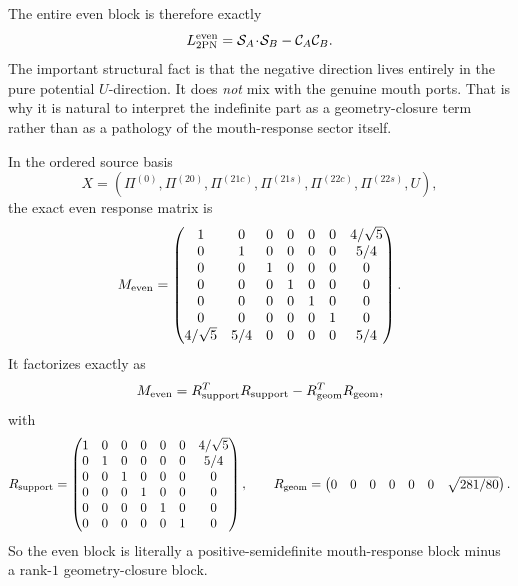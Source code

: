\documentclass[11pt]{article}
\begin{document}
The entire even block is therefore exactly
\begin{equation}
L^{\rm even}_{2\mathrm{PN}}=\mathcal S_A\!\cdot\!\mathcal S_B-\mathcal C_A\mathcal C_B.
\label{eq:mouth-port-even-factorized}
\end{equation}
The important structural fact is that the negative direction lives entirely in the pure
potential \(U\)-direction.  It does \emph{not} mix with the genuine mouth ports.
That is why it is natural to interpret the indefinite part as a geometry-closure term
rather than as a pathology of the mouth-response sector itself.

In the ordered source basis
\begin{equation}
X=(\Pi^{(0)},\Pi^{(20)},\Pi^{(21c)},\Pi^{(21s)},\Pi^{(22c)},\Pi^{(22s)},U),
\label{eq:mouth-port-Xbasis}
\end{equation}
the exact even response matrix is
\begin{equation}
M_{\rm even}=
\begin{pmatrix}
1&0&0&0&0&0&4/\sqrt5\\
0&1&0&0&0&0&5/4\\
0&0&1&0&0&0&0\\
0&0&0&1&0&0&0\\
0&0&0&0&1&0&0\\
0&0&0&0&0&1&0\\
4/\sqrt5&5/4&0&0&0&0&5/4
\end{pmatrix}.
\label{eq:mouth-port-Meven}
\end{equation}
It factorizes exactly as
\begin{equation}
M_{\rm even}=R_{\rm support}^{T}R_{\rm support}-R_{\rm geom}^{T}R_{\rm geom},
\label{eq:mouth-port-matrix-factorization}
\end{equation}
with
\begin{equation}
R_{\rm support}=
\begin{pmatrix}
1&0&0&0&0&0&4/\sqrt5\\
0&1&0&0&0&0&5/4\\
0&0&1&0&0&0&0\\
0&0&0&1&0&0&0\\
0&0&0&0&1&0&0\\
0&0&0&0&0&1&0
\end{pmatrix},
\qquad
R_{\rm geom}=\begin{pmatrix}0&0&0&0&0&0&\sqrt{281/80}\end{pmatrix}.
\label{eq:mouth-port-Rsupport-Rgeom}
\end{equation}
So the even block is literally a positive-semidefinite mouth-response block minus a
rank-\(1\) geometry-closure block.
\end{document}
